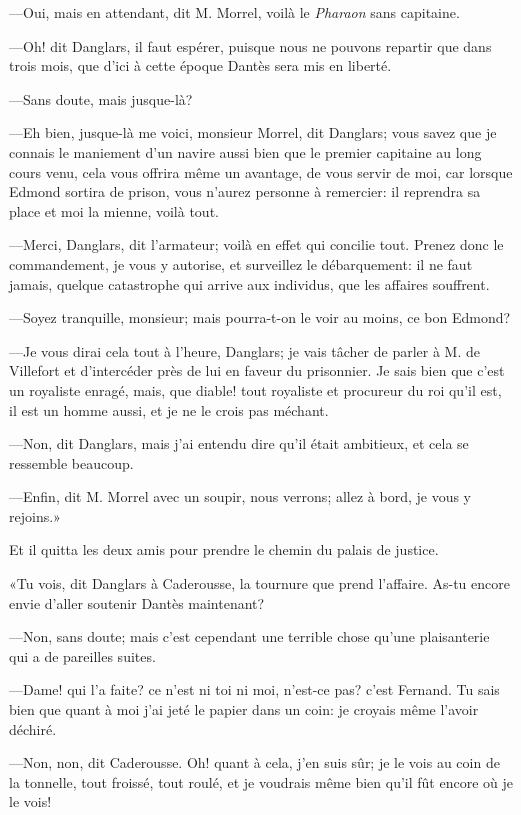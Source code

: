 —Oui, mais en attendant, dit M. Morrel, voilà le \textit{Pharaon} sans capitaine.

—Oh! dit Danglars, il faut espérer, puisque nous ne pouvons repartir que dans trois mois, que d'ici à cette époque Dantès sera mis en liberté.

—Sans doute, mais jusque-là?

—Eh bien, jusque-là me voici, monsieur Morrel, dit Danglars; vous savez que je connais le maniement d'un navire aussi bien que le premier capitaine au long cours venu, cela vous offrira même un avantage, de vous servir de moi, car lorsque Edmond sortira de prison, vous n'aurez personne à remercier: il reprendra sa place et moi la mienne, voilà tout.

—Merci, Danglars, dit l'armateur; voilà en effet qui concilie tout. Prenez donc le commandement, je vous y autorise, et surveillez le débarquement: il ne faut jamais, quelque catastrophe qui arrive aux individus, que les affaires souffrent.

—Soyez tranquille, monsieur; mais pourra-t-on le voir au moins, ce bon Edmond?

—Je vous dirai cela tout à l'heure, Danglars; je vais tâcher de parler à M. de Villefort et d'intercéder près de lui en faveur du prisonnier. Je sais bien que c'est un royaliste enragé, mais, que diable! tout royaliste et procureur du roi qu'il est, il est un homme aussi, et je ne le crois pas méchant.

—Non, dit Danglars, mais j'ai entendu dire qu'il était ambitieux, et cela se ressemble beaucoup.

—Enfin, dit M. Morrel avec un soupir, nous verrons; allez à bord, je vous y rejoins.»

Et il quitta les deux amis pour prendre le chemin du palais de justice.

«Tu vois, dit Danglars à Caderousse, la tournure que prend l'affaire. As-tu encore envie d'aller soutenir Dantès maintenant?

—Non, sans doute; mais c'est cependant une terrible chose qu'une plaisanterie qui a de pareilles suites.

—Dame! qui l'a faite? ce n'est ni toi ni moi, n'est-ce pas? c'est Fernand. Tu sais bien que quant à moi j'ai jeté le papier dans un coin: je croyais même l'avoir déchiré.

—Non, non, dit Caderousse. Oh! quant à cela, j'en suis sûr; je le vois au coin de la tonnelle, tout froissé, tout roulé, et je voudrais même bien qu'il fût encore où je le vois!

